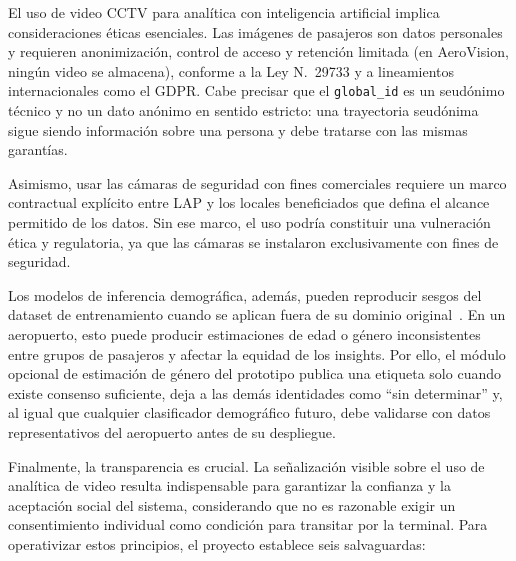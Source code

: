 \documentclass[12pt,letterpaper]{article}
\begin{document}
El uso de video CCTV para analítica con inteligencia artificial implica
consideraciones éticas esenciales. Las imágenes de pasajeros son datos
personales y requieren anonimización, control de acceso y retención
limitada (en AeroVision, ningún video se almacena), conforme a la Ley N.\textdegree~29733 y a lineamientos
internacionales como el GDPR. Cabe precisar que el \texttt{global\_id} es
un seudónimo técnico y no un dato anónimo en sentido estricto: una
trayectoria seudónima sigue siendo información sobre una persona y debe
tratarse con las mismas garantías.

Asimismo, usar las cámaras de seguridad con fines comerciales requiere un
marco contractual explícito entre LAP y los locales beneficiados que
defina el alcance permitido de los datos. Sin ese marco, el uso podría
constituir una vulneración ética y regulatoria, ya que las cámaras se
instalaron exclusivamente con fines de seguridad.

Los modelos de inferencia demográfica, además, pueden reproducir sesgos
del dataset de entrenamiento cuando se aplican fuera de su dominio
original~\cite{jin2024}. En un aeropuerto, esto puede producir
estimaciones de edad o género inconsistentes entre grupos de pasajeros y
afectar la equidad de los insights. Por ello, el módulo opcional de
estimación de género del prototipo publica una etiqueta solo cuando
existe consenso suficiente, deja a las demás identidades como ``sin
determinar'' y, al igual que cualquier clasificador demográfico futuro,
debe validarse con datos representativos del aeropuerto antes de su
despliegue.

Finalmente, la transparencia es crucial. La señalización visible sobre el
uso de analítica de video resulta indispensable para garantizar la
confianza y la aceptación social del sistema, considerando que no es
razonable exigir un consentimiento individual como condición para
transitar por la terminal. Para operativizar estos principios, el
proyecto establece seis salvaguardas:
\end{document}
